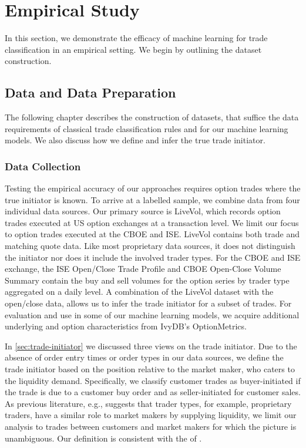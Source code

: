 \section{Empirical Study}\label{sec:empirical-study}

In this section, we demonstrate the efficacy of machine learning for trade classification in an empirical setting. We begin by outlining the dataset construction.

\subsection{Data and Data Preparation}\label{sec:data-and-data-preparation}

The following chapter describes the construction of datasets, that suffice the data requirements of classical trade classification rules and for our machine learning models. We also discuss how we define and infer the true trade initiator.

\subsubsection{Data Collection}\label{sec:data-collection}


Testing the empirical accuracy of our approaches requires option trades where the true initiator is known. To arrive at a labelled sample, we combine data from four individual data sources. Our primary source is LiveVol, which records option trades executed at US option exchanges at a transaction level. We limit our focus to option trades executed at the \gls{CBOE} and \gls{ISE}. LiveVol contains both trade and matching quote data. Like most proprietary data sources, it does not distinguish the initiator nor does it include the involved trader types. For the \gls{CBOE} and \gls{ISE} exchange, the \gls{ISE} Open/Close Trade Profile and \gls{CBOE} Open-Close Volume Summary contain the buy and sell volumes for the option series by trader type aggregated on a daily level. A combination of the LiveVol dataset with the open/close data, allows us to infer the trade initiator for a subset of trades. For evaluation and use in some of our machine learning models, we acquire additional underlying and option characteristics from IvyDB's OptionMetrics.

In \cref{sec:trade-initiator} we discussed three views on the trade initiator. Due to the absence of order entry times or order types in our data sources, we define the trade initiator based on the position relative to the market maker, who caters to the liquidity demand. Specifically, we classify customer trades as buyer-initiated if the trade is due to a customer buy order and as seller-initiated for customer sales. As previous literature, e.g., \textcite[][4276]{garleanuDemandBasedOptionPricing2009} suggests that trader types, for example, proprietary traders, have a similar role to market makers by supplying liquidity, we limit our analysis to trades between customers and market makers for which the picture is unambiguous. Our definition is consistent with the of \textcite[][8]{grauerOptionTradeClassification2022}.



